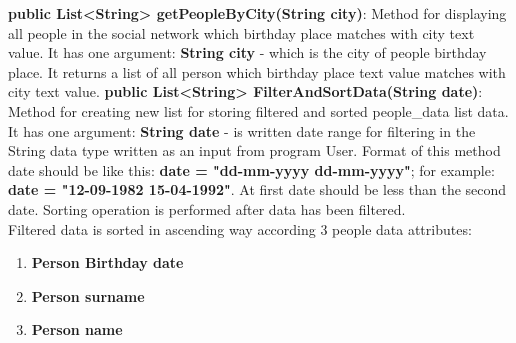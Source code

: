 \documentclass[a4paper]{article}
\begin{document}
\begin{itemize}
\subitem \textbf{public List<String> getPeopleByCity(String city)}: Method for displaying all people in the social network which birthday place matches with city text value. It has one argument: \textbf{String city} - which is the city of people birthday place. It returns a list of all person which birthday place text value matches with city text value.
\subitem \textbf{public List<String> FilterAndSortData(String date)}: Method for creating new list for storing filtered and sorted people\_data list data. It has one argument: \textbf{String date} - is written date range for filtering in the String data type written as an input from program User. Format of this method date should be like this: \textbf{date = "dd-mm-yyyy dd-mm-yyyy"}; for example: \textbf{date = "12-09-1982 15-04-1992"}. At first date should be less than the second date. Sorting operation is performed after data has been filtered.\\
Filtered data is sorted in ascending way according 3 people data attributes:
\begin{enumerate}
\item \textbf{Person Birthday date}
\item \textbf{Person surname}
\item \textbf{Person name}
\end{enumerate}
\end{itemize}


\end{document}
